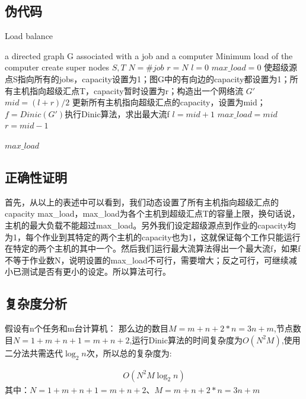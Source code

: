 \documentclass[UTF8,a4paper,12pt]{article}
\begin{document}
\begin{CJK}{UTF8}{gkai}
	\subsection{伪代码}
	
	\begin{algorithm}[htb]
		\caption{Load balance}
		\begin{algorithmic}[1]
			\Require a directed graph G associated with a job and a computer
			\Ensure Minimum load of the computer
			\State create super nodes $S,T$
			\State $ N = \#job$
			\State $ r = N $
			\State $ l = 0 $
			\State $ max\_load = 0 $
			\State 使超级源点S指向所有的jobs，capacity设置为1；图G中的有向边的capacity都设置为1；所有主机指向超级汇点T，capacity暂时设置为r；构造出一个网络流 $ G' $
				\State $ mid = (l+r)/2 $
				\State 更新所有主机指向超级汇点的capacity，设置为mid；
				\State $f=Dinic(G')$执行Dinic算法，求出最大流f
					\State $l = mid+1$
					\State $max\_load = mid$
				\Else
					\State $r = mid-1$
				\EndIf
			\EndWhile
			
			\State \Return $max\_load$
			\EndFunction	
		\end{algorithmic}
	\end{algorithm}
	
	\subsection{正确性证明}
		首先，从以上的表述中可以看到，我们动态设置了所有主机指向超级汇点的capacity max\_load，max\_load为各个主机到超级汇点T的容量上限，换句话说，主机的最大负载不能超过max\_load。另外我们设定超级源点到作业的capacity均为1，每个作业到其特定的两个主机的capacity也为1，这就保证每个工作只能运行在特定的两个主机的其中一个。然后我们运行最大流算法得出一个最大流f，如果f不等于作业数N，说明设置的max\_load不可行，需要增大；反之可行，可继续减小已测试是否有更小的设定。所以算法可行。
		
	\subsection{复杂度分析}
		假设有n个任务和m台计算机：
		那么边的数目$ M=m+n+2*n=3n+m $,节点数目$ N=1+m+n+1=m+n+2 $,运行Dinic算法的时间复杂度为$ O(N^2M) $,使用二分法共需迭代$ \log_{2}n $次，所以总的复杂度为:
		
		\begin{equation*}
			\begin{split}
			O(N^{2}M\log_{2}n)
			\end{split}
		\end{equation*}
		其中：$ N=1+m+n+1=m+n+2 $、$ M=m+n+2*n=3n+m $


\end{CJK}
\end{document}
